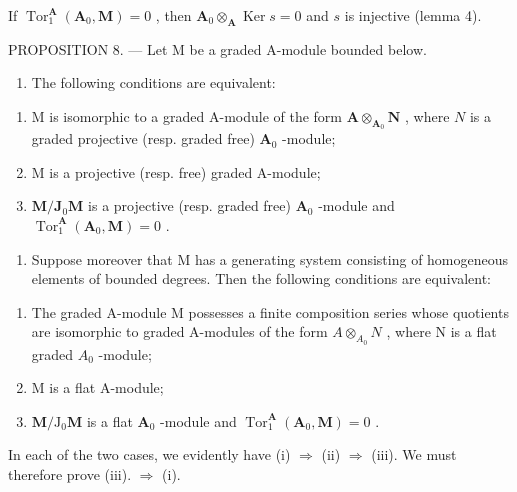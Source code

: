If \(\operatorname{Tor}_1^{\mathbf{A}}(\mathbf{A}_0, \mathbf{M}) = 0\) , then \(\mathbf{A}_0 \otimes_{\mathbf{A}} \operatorname{Ker} s = 0\) and \(s\) is injective (lemma 4).

PROPOSITION 8. --- Let M be a graded A-module bounded below.

\begin{enumerate}
\def\labelenumi{\alph{enumi})}
\tightlist
\item
  The following conditions are equivalent:
\end{enumerate}

\begin{enumerate}
\def\labelenumi{(\roman{enumi})}
\item
  M is isomorphic to a graded A-module of the form \(\mathbf{A} \otimes_{\mathbf{A}_0} \mathbf{N}\) , where \(N\) is a graded projective (resp. graded free) \(\mathbf{A}_0\) -module;
\item
  M is a projective (resp. free) graded A-module;
\item
  \(\mathbf{M} / \mathbf{J}_0\mathbf{M}\) is a projective (resp. graded free) \(\mathbf{A}_0\) -module and \(\operatorname{Tor}_1^{\mathbf{A}}(\mathbf{A}_0,\mathbf{M}) = 0\) .
\end{enumerate}

\begin{enumerate}
\def\labelenumi{\alph{enumi})}
\setcounter{enumi}{1}
\tightlist
\item
  Suppose moreover that M has a generating system consisting of homogeneous elements of bounded degrees. Then the following conditions are equivalent:
\end{enumerate}

\begin{enumerate}
\def\labelenumi{(\roman{enumi})}
\item
  The graded A-module M possesses a finite composition series whose quotients are isomorphic to graded A-modules of the form \(A \otimes_{A_{0}} N\) , where N is a flat graded \(A_{0}\) -module;
\item
  M is a flat A-module;
\item
  \(\mathbf{M} / \mathrm{J}_0\mathbf{M}\) is a flat \(\mathbf{A}_0\) -module and \(\operatorname{Tor}_1^{\mathbf{A}}(\mathbf{A}_0,\mathbf{M}) = 0\) .
\end{enumerate}

In each of the two cases, we evidently have (i) \(\Rightarrow\) (ii) \(\Rightarrow\) (iii). We must therefore prove (iii). \(\Rightarrow\) (i).

